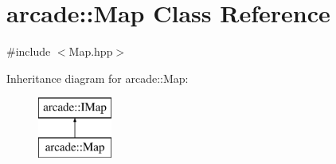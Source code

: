 \hypertarget{classarcade_1_1_map}{\section{arcade\-:\-:Map Class Reference}
\label{classarcade_1_1_map}
}


{\ttfamily \#include $<$Map.\-hpp$>$}

Inheritance diagram for arcade\-:\-:Map\-:\begin{figure}[H]
\begin{center}
\leavevmode
\includegraphics[height=2.000000cm]{classarcade_1_1_map}
\end{center}
\end{figure}
